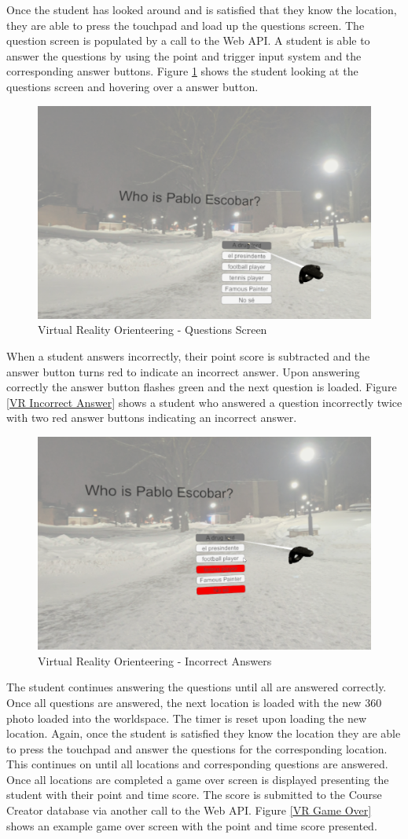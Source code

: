 Once the student has looked around and is satisfied that they know the location, they are able to press the touchpad and load up the questions screen. The question screen is populated by a call to the Web API. A student is able to answer the questions by using the point and trigger input system and the corresponding answer buttons. Figure \ref{VR Question} shows the student looking at the questions screen and hovering over a answer button. 
\begin{figure}[htb]
	\centering
	\includegraphics[width=.6\textwidth]{Requirements/assets/vr-view-questions.png}
	\caption[Virtual Reality Orienteering - Questions Screen]{\label{VR Question}Virtual Reality Orienteering - Questions Screen}
\end{figure}
When a student answers incorrectly, their point score is subtracted and the answer button turns red to indicate an incorrect answer. Upon answering correctly the answer button flashes green and the next question is loaded. Figure \ref{VR Incorrect Answer} shows a student who answered a question incorrectly twice with two red answer buttons indicating an incorrect answer.
\begin{figure}[htb]
	\centering
	\includegraphics[width=.6\textwidth]{Requirements/assets/vr-answer-incorrectly.png}
	\caption[Virtual Reality Orienteering - Incorrect Answers]{\label{VR Incorrect Answers}Virtual Reality Orienteering - Incorrect Answers}
\end{figure}
The student continues answering the questions until all are answered correctly. Once all questions are answered, the next location is loaded with the new 360 photo loaded into the worldspace. The timer is reset upon loading the new location. Again, once the student is satisfied they know the location they are able to press the touchpad and answer the questions for the corresponding location. This continues on until all locations and corresponding questions are answered. Once all locations are completed a game over screen is displayed presenting the student with their point and time score. The score is submitted to the Course Creator database via another call to the Web API. Figure \ref{VR Game Over} shows an example game over screen with the point and time score presented. 
